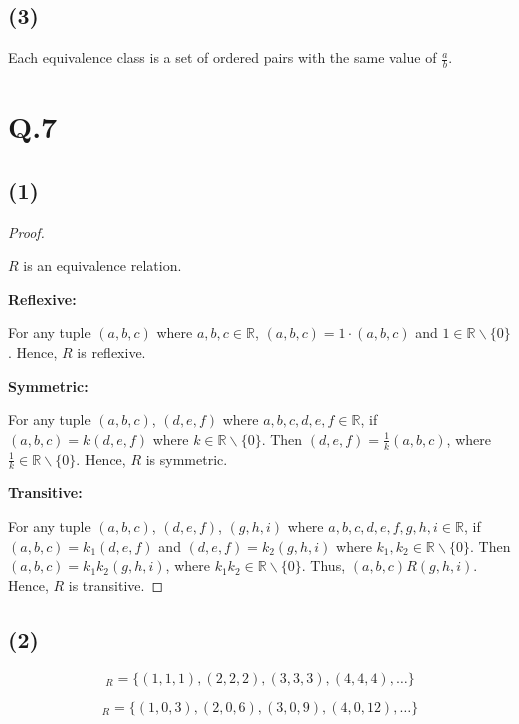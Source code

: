 \documentclass[a4paper,12pt]{article}
\begin{document}
\subsection*{(3)}

Each equivalence class is a set of ordered pairs with the same value of $\frac{a}{b}$.

\section*{Q.7}

\subsection*{(1)}

\begin{proof}
$ $

$R$ is an equivalence relation.

\textbf{Reflexive:}

For any tuple $(a, b, c)$ where $a, b, c \in \mathbb{R}$, $(a, b, c) = 1 \cdot (a, b, c)$ and $1 \in \mathbb{R} \backslash \{0\}$.
Hence, $R$ is reflexive.

\textbf{Symmetric:}

For any tuple $(a, b, c)$, $(d, e, f)$ where $a, b, c, d, e, f \in \mathbb{R}$, if $(a, b, c) = k (d, e, f)$ where $k \in \mathbb{R} \backslash \{0\}$.
Then $(d, e, f) = \frac{1}{k} (a, b, c)$, where $\frac{1}{k} \in \mathbb{R} \backslash \{0\}$.
Hence, $R$ is symmetric.

\textbf{Transitive:}

For any tuple $(a, b, c)$, $(d, e, f)$, $(g, h, i)$ where $a, b, c, d, e, f, g, h, i \in \mathbb{R}$, if $(a, b, c) = k_1 (d, e, f)$ and $(d, e, f) = k_2 (g, h, i)$ where $k_1, k_2 \in \mathbb{R} \backslash \{0\}$.
Then $(a, b, c) = k_1 k_2 (g, h, i)$, where $k_1 k_2 \in \mathbb{R} \backslash \{0\}$.
Thus, $(a, b, c) R (g, h, i)$.
Hence, $R$ is transitive.
\end{proof}

\subsection*{(2)}

\begin{equation*}
	[(1,1,1)]_R = \{(1,1,1), (2,2,2), (3,3,3), (4,4,4), \dots\}
\end{equation*}

\begin{equation*}
	[(1,0,3)]_R = \{(1,0,3), (2,0,6), (3,0,9), (4,0,12), \dots\}
\end{equation*}
\end{document}
